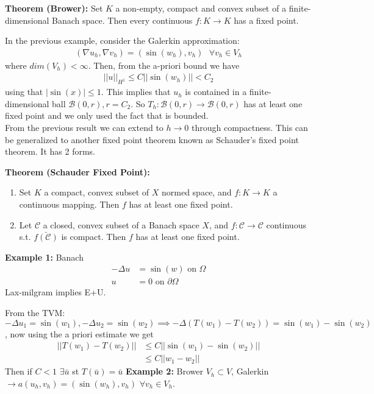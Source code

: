 \textbf{Theorem (Brower):} Set $K$ a non-empty, compact and convex subset of a finite-dimensional Banach space. Then every continuous $f:K\to K$ has a fixed point.

In the previous example, consider the Galerkin approximation:
\begin{align*}
    (\nabla u_h,\nabla v_h)=(\sin(w_h),v_h) \text{   } \forall v_h \in V_h
\end{align*}
where $dim(V_h)<\infty$. Then, from the a-priori bound we have 
\begin{align*}
    ||u||_{H^1}\leq C||\sin (w_h)||< C_2
\end{align*}
using that $|\sin (x)|\leq 1$. This implies that $u_h$ is contained in a finite-dimensional ball $\mathcal{B}(0,r), r=C_2$. So $T_h:\mathcal{B}(0,r)\to \mathcal{B}(0,r)$ has at least one fixed point and we only used the fact that is bounded.\\

From the previous result we can extend to $h\to 0$ through compactness. This can be generalized to another fixed point theorem known as Schauder's fixed point theorem. It has 2 forms.

\textbf{Theorem (Schauder Fixed Point):}
\begin{enumerate}[label = \alph*]
    \item Set $K$ a compact, convex subset of $X$ normed space, and $f:K\to K$ a continuous mapping. Then $f$ has at least one fixed point.
    \item Let $\mathcal{C}$ a closed, convex subset of a Banach space $X$, and $f:\mathcal{C}\to \mathcal{C}$ continuous s.t. $\bar{f(\mathcal{C})}$ is compact. Then $f$ has at least one fixed point.
\end{enumerate}

\textbf{Example 1:} Banach
\begin{align*}
    -\Delta u &= \sin(w) \text{ on }\Omega\\
    u&=0\text{ on }\partial\Omega
\end{align*}
Lax-milgram implies E+U.

From the TVM: $-\Delta u_1 = \sin(w_1), -\Delta u_2=\sin(w_2)\implies -\Delta(T(w_1)-T(w_2))= \sin(w_1)-\sin(w_2)$, now using the a priori estimate we get
\begin{align}
    ||T(w_1)-T(w_2)||&\leq C||\sin(w_1)-\sin(w_2)||\\
    &\leq C||w_1-w_2||\tag{Sin is 1-Lipschitz}
\end{align}
Then if $C<1$ $\exists\bar u$ st $T(\bar u)= \bar u $ 
\textbf{Example 2:} Brower
$V_h\subset V$, Galerkin $\to a(u_h,v_h)=(\sin(w_h),v_h)$ $ \forall v_h\in V_h$.


